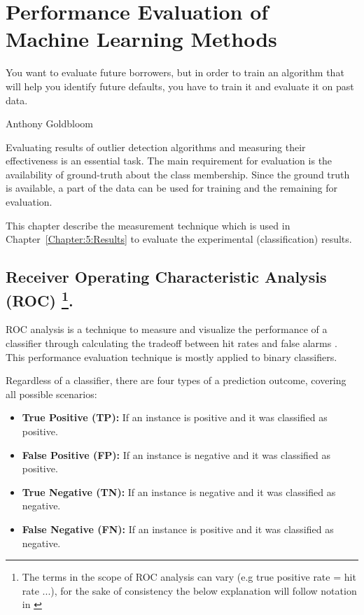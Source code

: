 \chapter{Performance Evaluation of Machine Learning Methods}\epigraph{You want to evaluate future borrowers, but in order to train an algorithm that will help you identify future defaults, you have to train it and evaluate it on past data.}{Anthony Goldbloom}\label{Chapter:4}

Evaluating results of outlier detection algorithms and measuring their effectiveness is an essential task. The main requirement for evaluation is the availability of ground-truth about the class membership. Since the ground truth is available, a part of the data can be used for training and the remaining for evaluation. 

This chapter describe the measurement technique which is used in Chapter~\ref{Chapter:5:Results} to evaluate the experimental (classification) results. 

\section[Receiver Operating Characteristic Analysis (ROC)] {Receiver Operating Characteristic Analysis (ROC) \footnote{The terms in the scope of ROC analysis can vary (e.g true positive rate = hit rate ...), for the sake of consistency the below explanation will follow notation in  \cite{Fawcett:2006:IRA:1159473.1159475}}.}\label{Chapter:4:ROC}

ROC analysis is a technique to measure and visualize the performance of a classifier through calculating the tradeoff between hit rates and false alarms \cite{Fawcett:2006:IRA:1159473.1159475}. This performance evaluation technique is mostly applied to binary classifiers.

Regardless of a classifier, there are four types of a prediction outcome, covering all possible scenarios:

\begin{itemize}
    \item \textbf{True Positive (TP): }  If an instance is positive and it was classified as positive.
      \item \textbf{False Positive (FP): } If an instance is negative and it was classified as positive.
    \item \textbf{True Negative (TN):}  If an instance is negative and it was classified as negative.
    \item \textbf{False Negative (FN):}  If an instance is positive and it was classified as negative.
\end{itemize}

